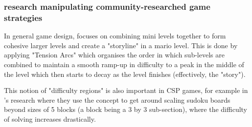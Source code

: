\subsubsection{research manipulating community-researched game strategies} \label{awa:minimisingSudokuValue}

In general game design, \citeauthor{marioEndless} focuses on combining mini levels together to form cohesive larger levels and create a "storyline" in a mario level. This is done by applying "Tension Arcs" which organises the order in which sub-levels are combined to maintain a smooth ramp-up in difficulty to a peak in the middle of the level which then starts to decay as the level finishes (effectively, the "story").

This notion of "difficulty regions" is also important in CSP games, for example in \citeauthor{sudokuGenerateBalancedHardness}'s research where they use the concept to get around scaling sudoku boards beyond sizes of 5 blocks (a block being a 3 by 3 sub-section), where the difficulty of solving increases drastically.



